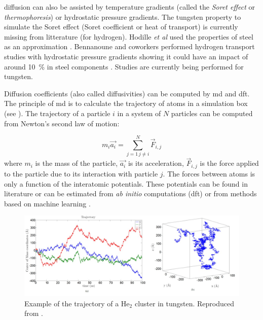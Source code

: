 \Gls{diffusion} can also be assisted by temperature gradients (called the \emph{\gls{Soret effect}} or \emph{\gls{thermophoresis}})  or hydrostatic pressure gradients.
The tungsten property to simulate the \gls{Soret effect} (Soret coefficient or heat of transport) is currently missing from litterature (for hydrogen).
Hodille \textit{et al} used the properties of steel as an approximation \cite{hodille_estimation_2017}.
Bennanoune and coworkers performed hydrogen transport studies with hydrostatic pressure gradients showing it could have an impact of around \SI{10}{\%} in steel components .
Studies are currently being performed for tungsten.

Diffusion coefficients (also called diffusivities) can be computed by \gls{md} and \gls{dft}.
The principle of \gls{md} is to calculate the trajectory of atoms in a simulation box (see ).
The trajectory of a particle $i$ in a system of $N$ particles can be computed from Newton's second law of motion:

\begin{equation}
    m_i \vec{a_i} = \sum_{j=1 \, j \neq i}^N \vec{F}_{i,j}
\end{equation}
where $m_i$ is the mass of the particle, $\vec{a_i}$ is its acceleration, $\vec{F}_{i,j}$ is the force applied to the particle due to its interaction with particle $j$.
The forces between atoms is only a function of the interatomic potentials.
These potentials can be found in literature or can be estimated from \textit{ab initio} computations (\gls{dft})  or from methods based on machine learning .

\begin{figure}
    \centering
    \includegraphics[width=\linewidth]{Figures/Chapter1/faney_md.jpg}
    \caption{Example of the trajectory of a He$_2$ cluster in tungsten. Reproduced from \cite{faney_numerical_2013}.}
\end{figure}

